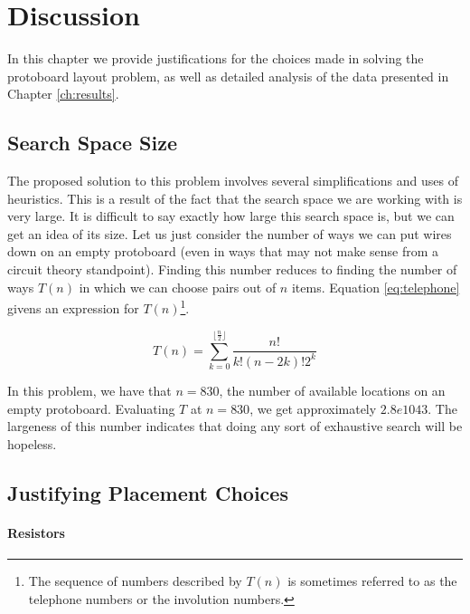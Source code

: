 
\chapter{Discussion}
\label{ch:discussion}

In this chapter we provide justifications for the choices made in solving the
protoboard layout problem, as well as detailed analysis of the data presented in
Chapter \ref{ch:results}.

\section{Search Space Size}
\label{sec:search_space_size}

The proposed solution to this problem involves several simplifications and uses
of heuristics. This is a result of the fact that the search space we are working
with is very large. It is difficult to say exactly how large this search space
is, but we can get an idea of its size. Let us just consider the number of ways
we can put wires down on an empty protoboard (even in ways that may not make
sense
from a circuit theory standpoint). Finding this number reduces to finding the
number of ways $T(n)$ in which we can choose pairs out of $n$ items. Equation
\ref{eq:telephone} givens an expression for $T(n)$\footnote{The sequence of
numbers described by $T(n)$ is sometimes referred to as the telephone numbers
or the involution numbers.}.

\begin{equation}
T(n) = \sum_{k = 0}^{\lfloor \frac{n}{2} \rfloor}{\frac{n!}{k! (n - 2k)! 2^k}}
\label{eq:telephone}
\end{equation}

In this problem, we have that $n = 830$, the number of available locations on an
empty protoboard. Evaluating $T$ at $n = 830$, we get approximately $2.8e1043$.
The largeness of this number indicates that doing any sort of exhaustive search
will be hopeless.

\section{Justifying Placement Choices}
\label{sec:justify_placement}

\subsubsection{Resistors}


